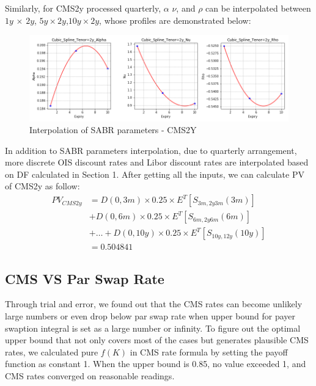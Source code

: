 \documentclass{article}
\begin{document}
	
	
	\noindent Similarly, for CMS2y processed quarterly, $\alpha$ $\nu$, and $\rho$ can be interpolated between $1y$ $\times$ $2y$, $5y\times2y$,$10y\times2y$, whose profiles are demonstrated below:\\ 
	
	\begin{figure}[h]
	\centering
	\includegraphics[scale=0.5]{Cubic_2y.png}
	\caption{Interpolation of SABR parameters - CMS2Y}
	\end{figure}	
	
	\noindent In addition to SABR parameters interpolation, due to quarterly arrangement, more discrete OIS discount rates and Libor discount rates are interpolated based on DF calculated in Section 1. After getting all the inputs, we can calculate PV of CMS2y as follow:
	\begin{align*}
	PV_{CMS2y}&=D(0,3m)\times 0.25 \times E^T [S_{3m,2y3m}(3m)] \\&+ D(0,6m) \times 0.25 \times E^T [S_{6m,2y6m}(6m)]\\&+ \dots 
	+D(0,10y) \times 0.25 \times E^T [S_{10y,12y}(10y)]\\&= 0.504841
	\end{align*}

	
	\subsection*{CMS VS Par Swap Rate}
	Through trial and error, we found out that the CMS rates can become unlikely large numbers or even drop below par swap rate when upper bound for payer swaption integral is set as a large number or infinity. To figure out the optimal upper bound that not only covers most of the cases but generates plausible CMS rates, we calculated pure $f(K)$ in CMS rate formula by setting the payoff function as constant 1. When the upper bound is 0.85, no value exceeded 1, and CMS rates converged on reasonable readings.
\end{document}
